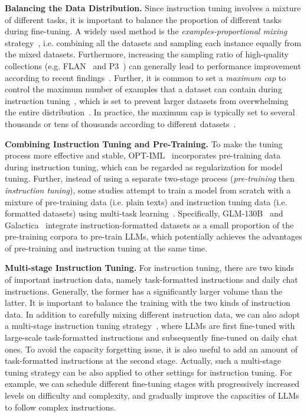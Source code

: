 \textbf{Balancing the Data Distribution.} Since instruction tuning involves a mixture of different tasks, it is important to balance the proportion of different tasks during fine-tuning. A widely used method is the \emph{examples-proportional mixing} strategy~\cite{Raffel-JMLR-2020-Exploring}, i.e. combining all the datasets and sampling each instance equally from the mixed datasets. Furthermore, increasing the sampling ratio of high-quality collections (e.g. FLAN~\cite{Wei-ICLR-2022-Finetuned} and P3~\cite{Bach-ACL-2022-PromptSource}) can generally lead to performance improvement according to recent findings~\cite{Chung-arxiv-2022-Scaling,Iyer-arxiv-2022-OPT}. Further, it is common to set a \emph{maximum cap} to control the maximum number of examples that  a dataset can contain during instruction tuning~\cite{Raffel-JMLR-2020-Exploring}, which is set to prevent larger datasets from overwhelming the entire distribution~\cite{Raffel-JMLR-2020-Exploring,Iyer-arxiv-2022-OPT}. In practice, the maximum cap is typically set to several thousands or tens of thousands according to different datasets~\cite{Wei-ICLR-2022-Finetuned,Chung-arxiv-2022-Scaling}. 

\textbf{Combining Instruction Tuning and Pre-Training.} To make the tuning process more effective and stable, OPT-IML~\cite{Iyer-arxiv-2022-OPT} incorporates pre-training data during instruction tuning, which can be regarded as regularization for model tuning. {Further, instead of using a separate two-stage process (\emph{pre-training} then \emph{instruction tuning}), some studies  attempt to train a model from scratch with a mixture of pre-training data (i.e. plain texts) and instruction tuning data (i.e. formatted  datasets)} using multi-task learning~\cite{Raffel-JMLR-2020-Exploring}. Specifically, GLM-130B~\cite{Zeng-arxiv-2022-GLM} and Galactica~\cite{Taylor-arxiv-2022-Galactica} integrate instruction-formatted datasets as a small proportion of the pre-training corpora to pre-train LLMs, which potentially achieves the advantages of pre-training and instruction tuning at the same time. 

\textbf{Multi-stage Instruction Tuning.} For instruction tuning, there are two kinds of important instruction data, namely task-formatted instructions and daily chat instructions. Generally, the former has a significantly larger volume than the latter. It is important to balance the training with the two kinds of  instruction data. In addition to carefully mixing different instruction data, we can also adopt a multi-stage instruction tuning strategy~\cite{YuLan-Chat}, where LLMs are first fine-tuned with large-scale task-formatted instructions and subsequently fine-tuned on daily chat ones. To avoid the capacity forgetting issue, it is also useful to add an amount of  task-formatted instructions at the second stage. Actually, such a multi-stage tuning strategy can be also applied to other settings for instruction tuning. For example, we can schedule different fine-tuning stages with progressively increased  levels on difficulty and complexity, and gradually improve the capacities of LLMs to follow complex instructions.

